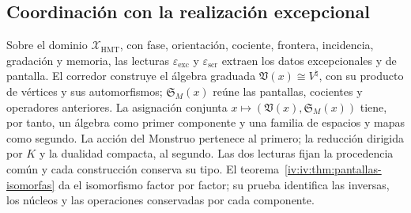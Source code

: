 \subsection{Coordinación con la realización excepcional}

Sobre el dominio \(\mathcal X_{\mathrm{HMT}}\), con fase, orientación,
cociente, frontera, incidencia, gradación y memoria, las lecturas
\(\varepsilon_{\mathrm{exc}}\) y \(\varepsilon_{\mathrm{scr}}\) extraen
los datos excepcionales y de pantalla. El corredor construye el álgebra
graduada \(\mathfrak V(x)\cong V^\natural\), con su producto de vértices
y sus automorfismos; \(\mathfrak S_M(x)\) reúne las pantallas, cocientes
y operadores anteriores. La asignación conjunta
\(x\mapsto(\mathfrak V(x),\mathfrak S_M(x))\) tiene, por tanto, un
álgebra como primer componente y una familia de espacios y mapas como segundo.
La acción del Monstruo pertenece al primero; la reducción dirigida por \(K\)
y la dualidad compacta, al segundo. Las dos lecturas fijan la procedencia
común y cada construcción conserva su tipo.
El teorema~\ref{iv:iv:thm:pantallas-isomorfas} da el isomorfismo
factor por factor; su prueba identifica las inversas, los núcleos
y las operaciones conservadas por cada componente.

